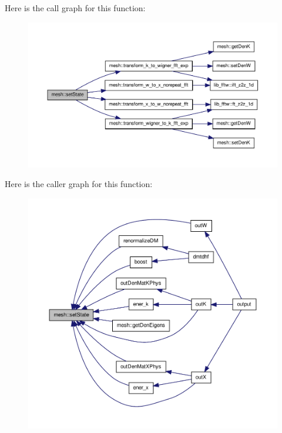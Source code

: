 Here is the call graph for this function:\nopagebreak
\begin{figure}[H]
\begin{center}
\leavevmode
\includegraphics[width=400pt]{namespacemesh_aef51df23ee69f610420b25672a2da3ef_cgraph}
\end{center}
\end{figure}




Here is the caller graph for this function:\nopagebreak
\begin{figure}[H]
\begin{center}
\leavevmode
\includegraphics[width=400pt]{namespacemesh_aef51df23ee69f610420b25672a2da3ef_icgraph}
\end{center}
\end{figure}


